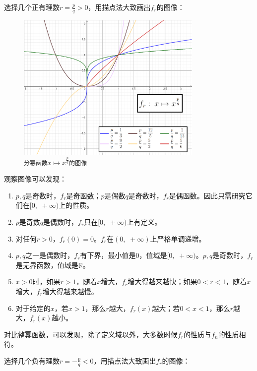 \documentclass[12pt,UTF8]{ctexbook}
\begin{document}
选择几个正有理数$r = \frac{p}{q} > 0$，用描点法大致画出$f_r$的图像：

\begin{figure}[h]
    \vspace{4pt}
    \centering
    \includegraphics[width=0.8\textwidth]{tu/分幂函数2.png}
    \caption*{\texttt{分幂函数}$x\mapsto x^\frac{p}{q}$\texttt{的图像}}
\end{figure}

观察图像可以发现：
\begin{enumerate}
    \item $p, q$是奇数时，$f_r$是奇函数；$p$是偶数$q$是奇数时，$f_r$是偶函数。因此只需研究它们在$[0, \,\, +\infty)$上的性质。
    \item $p$是奇数$q$是偶数时，$f_r$只在$[0,\,\,  +\infty)$上有定义。
    \item 对任何$r > 0$，$f_r(0) = 0$。$f_r$在$(0, \,\, +\infty)$上严格单调递增。
    \item $p, q$之一是偶数时，$f_r$有下界，最小值是$0$，值域是$[0, \,\, +\infty)$。$p, q$是奇数时，$f_r$是无界函数，值域是$\mathbb{R}$。
    \item $x>0$时，如果$r>1$，随着$x$增大，$f_r$增大得越来越快；如果$0 < r < 1$，随着$x$增大，$f_r$增大得越来越慢。
    \item 对于给定的$x$，若$x>1$，那么$r$越大，$f_r(x)$越大；若$0 < x<1$，那么$r$越大，$f_r(x)$越小。
\end{enumerate}
对比整幂函数，可以发现，除了定义域以外，大多数时候$f_r$的性质与$f_n$的性质相符。

选择几个负有理数$r = -\frac{p}{q} < 0$，用描点法大致画出$f_r$的图像：
\end{document}
